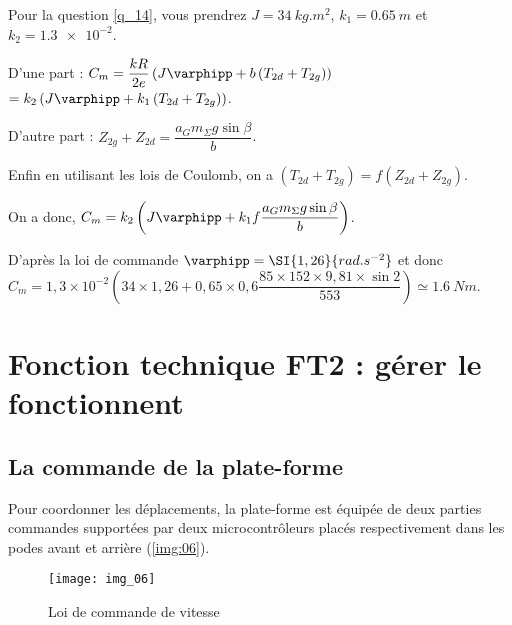 Pour la question \ref{q_14}, vous prendrez $J =\SI{34}{kg.m^2}$, $k_1 =\SI{0,65}{m}$ et $k_2 = \num{1,3e-2}$.

\ifprof
\begin{corrige}
D'une part : $  C_m  =\dfrac{kR}{2e} \left(J\varphipp  +b\left( T_{2d} +T_{2g} \right)\right) $ 
$=k_2 \left(J\varphipp  +k_1\left( T_{2d} +T_{2g} \right)\right) $.

D'autre part : $Z_{2g}+ Z_{2d}= \dfrac{ a_G  m_\Sigma g \sin \beta  }{b} $.

Enfin en utilisant les lois de Coulomb, on a $\left( T_{2d} +T_{2g} \right) = f\left( Z_{2d} +Z_{2g} \right)$.

On a donc, $  C_m  =k_2 \left(J\varphipp  +k_1f\dfrac{ a_G  m_\Sigma g \sin \beta  }{b}\right) $.

D'après la loi de commande $\varphipp = \SI{1,26}{rad.s^{-2}}$
et donc $C_m = 1,3\times 10^{-2}\left(34\times 1,26 + 0,65 \times 0,6 \dfrac{ 85 \times 152 \times  9,81 \times  \sin 2 }{553}\right) \simeq \SI{1,6}{Nm}$.

\end{corrige}
\else
\fi



\section{Fonction technique FT2 : gérer le fonctionnent}

\subsection{La commande de la plate-forme}

\ifprof
\else

Pour coordonner les déplacements, la plate-forme est équipée de deux parties commandes supportées par deux microcontrôleurs placés respectivement dans les podes avant et arrière (\autoref{img:06}).

\begin{figure}[H]
\centering
\texttt{[image: img\_06]}
\caption{Loi de commande de vitesse \label{img:06}}
\end{figure}

